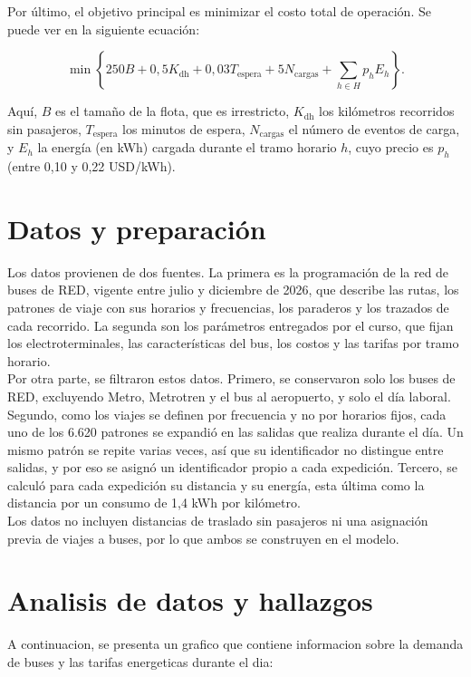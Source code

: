 Por último, el objetivo principal es minimizar el costo total de operación. Se puede ver en la siguiente ecuación:

\begin{equation}
    \min
    \left\{
        250 B + 0{,}5 K_{\mathrm{dh}} + 0{,}03 T_{\mathrm{espera}}
        + 5 N_{\mathrm{cargas}}
        + \sum_{h \in H} p_h E_h
    \right\}.\tag{1}
\end{equation}

Aquí, $B$ es el tamaño de la flota, que es irrestricto, $K_{\mathrm{dh}}$ los kilómetros recorridos sin pasajeros, $T_{\mathrm{espera}}$ los minutos de espera, $N_{\mathrm{cargas}}$ el número de eventos de carga, y $E_h$ la energía (en kWh) cargada durante el tramo horario $h$, cuyo precio es $p_h$ (entre 0,10 y 0,22 USD/kWh).



\section{Datos y preparación}
\label{sec:datos-informe2}

Los datos provienen de dos fuentes. La primera es la programación de la red de buses de RED, vigente entre julio y diciembre de 2026, que describe las rutas, los patrones de viaje con sus horarios y frecuencias, los paraderos y los trazados de cada recorrido. La segunda son los parámetros entregados por el curso, que fijan los electroterminales, las características del bus, los costos y las tarifas por tramo horario. \\
Por otra parte, se filtraron estos datos. Primero, se conservaron solo los buses de RED, excluyendo Metro, Metrotren y el bus al aeropuerto, y solo el día laboral. \\
Segundo, como los viajes se definen por frecuencia y no por horarios fijos, cada uno de los 6.620 patrones se expandió en las salidas que realiza durante el día. Un mismo patrón se repite varias veces, así que su identificador no distingue entre salidas, y por eso se asignó un identificador propio a cada expedición. Tercero, se calculó para cada expedición su distancia y su energía, esta última como la distancia por un consumo de 1,4 kWh por kilómetro. \\
Los datos no incluyen distancias de traslado sin pasajeros ni una asignación previa de viajes a buses, por lo que ambos se construyen en el modelo.

\section{Analisis de datos y hallazgos}
\label{sec:modelo-informe2}
A continuacion, se presenta un grafico que contiene informacion sobre la demanda de buses y las tarifas energeticas durante el dia:

